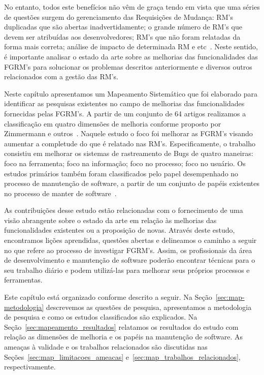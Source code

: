 No entanto, todos este benefícios não vêm de graça tendo em vista que uma séries
de questões surgem do gerenciamento das Requisições de Mudança: RM's duplicadas
que são abertas inadvertidamente; o grande número de RM's que devem ser
atribuídas aos desenvolvedores; RM's que não foram relatadas da forma mais
correta; análise de impacto de determinada RM e
etc~\cite{cavalcanti2014challenges}. Neste sentido, é importante analisar o
estado da arte sobre as melhorias das funcionalidades das FGRM's para solucionar
os problemas descritos anteriormente e diversos outros relacionados com a gestão
das RM's.

Neste capítulo apresentamos um Mapeamento Sistemático que foi elaborado para
identificar as pesquisas existentes no campo de melhorias das funcionalidades
fornecidas pelas FGRM's. A partir de um conjunto de 64 artigos realizamos a
classificação em quatro dimensões de melhoria conforme proposto por Zimmermann e
outros~\cite{zimmermann2009improving}. Naquele estudo o foco foi melhorar as
FGRM's visando aumentar a completude do que é relatado nas RM's.
Especificamente, o trabalho consistiu em melhorar os sistemas de rastreamento de
Bugs de quatro maneiras: foco na ferramenta; foco na informação; foco no
processo; foco no usuário. Os estudos primários também  foram classificados pelo
papel desempenhado no processo de manutenção de software, a partir de um
conjunto de papéis existentes no processo de manter de software~\cite{Polo1999}.

As contribuições desse estudo estão relacionadas com o fornecimento de uma visão
abrangente sobre o estado da arte em relação às melhorias das funcionalidades
existentes ou a proposição de novas. Através deste estudo, encontramos lições
aprendidas, questões abertas e delineamos o caminho a seguir no que refere ao
processo de investigar FGRM's. Assim, os profissionais da área de
desenvolvimento e manutenção de software poderão encontrar técnicas para o seu
trabalho diário e podem utilizá-las para melhorar seus próprios processos e
ferramentas.

Este capítulo está organizado conforme descrito a seguir. Na
Seção~\ref{sec:map-metodologia} descrevemos as questões de pesquisa,
apresentamos a metodologia de pesquisa e como os estudos classificados são
explicados.  Na Seção~\ref{sec:mapeamento_resultados} relatamos os resultados do
estudo com relação as dimensões de melhoria e os papéis na manutenção de
software. As ameaças à validade e os trabalhos relacionados são discutidas nas
Seções~\ref{sec:map_limitacoes_ameacas} e~\ref{sec:map_trabalhos_relacionados},
respectivamente.

